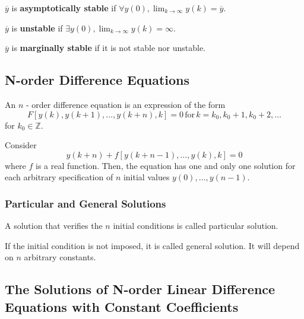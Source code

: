 \begin{definition}
    \(\overline{y}\) is \textbf{asymptotically stable} if \(\forall y(0), \lim_{k \to \infty} y(k) = \overline{y}\).
\end{definition}

\begin{definition}
    \(\overline{y}\) is \textbf{unstable} if \(\exists y(0), \lim_{k \to \infty} y(k) = \infty\).
\end{definition}

\begin{definition}
    \(\overline{y}\) is \textbf{marginally stable} if it is not stable nor unstable.
\end{definition}

\subsection{N-order Difference Equations}

\begin{definition}
    An \(n\) - order difference equation is an expression of the form \[F[y(k),y(k + 1),\ldots ,y(k + n),k] = 0\,\text{for}\, k = k_{0},k_{0} + 1,k_{0} + 2,\ldots\] for \(k_{0} \in \mathbb{Z}\).
\end{definition}


\begin{theorem}
    Consider \[
        y(k + n) + f[y(k + n - 1),\ldots ,y(k),k] = 0
    \] where \(f\) is a real function. Then, the equation has one and only one solution for each arbitrary specification of \(n\) initial values \(y(0), \ldots , y(n - 1)\).
\end{theorem}

\subsubsection{Particular and General Solutions}

\begin{definition}
    A solution that verifies the \(n\) initial conditions is called particular solution.
\end{definition}
\begin{definition}
    If the initial condition is not imposed, it is called general solution. It will depend on \(n\) arbitrary constants.
\end{definition}


\subsection{The Solutions of N-order Linear Difference Equations with Constant Coefficients}

